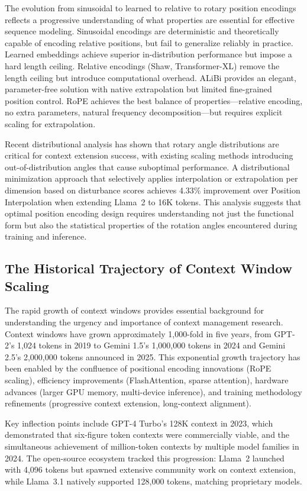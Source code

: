 \documentclass[11pt,letterpaper]{article}
\begin{document}
The evolution from sinusoidal to learned to relative to rotary position encodings reflects a progressive understanding of what properties are essential for effective sequence modeling. Sinusoidal encodings are deterministic and theoretically capable of encoding relative positions, but fail to generalize reliably in practice. Learned embeddings achieve superior in-distribution performance but impose a hard length ceiling. Relative encodings (Shaw, Transformer-XL) remove the length ceiling but introduce computational overhead. ALiBi provides an elegant, parameter-free solution with native extrapolation but limited fine-grained position control. RoPE achieves the best balance of properties---relative encoding, no extra parameters, natural frequency decomposition---but requires explicit scaling for extrapolation.

Recent distributional analysis has shown that rotary angle distributions are critical for context extension success, with existing scaling methods introducing out-of-distribution angles that cause suboptimal performance. A distributional minimization approach that selectively applies interpolation or extrapolation per dimension based on disturbance scores achieves 4.33\% improvement over Position Interpolation when extending Llama~2 to 16K tokens. This analysis suggests that optimal position encoding design requires understanding not just the functional form but also the statistical properties of the rotation angles encountered during training and inference.

\subsection{The Historical Trajectory of Context Window Scaling}

The rapid growth of context windows provides essential background for understanding the urgency and importance of context management research. Context windows have grown approximately 1,000-fold in five years, from GPT-2's 1,024 tokens in 2019 to Gemini 1.5's 1,000,000 tokens in 2024 and Gemini 2.5's 2,000,000 tokens announced in 2025. This exponential growth trajectory has been enabled by the confluence of positional encoding innovations (RoPE scaling), efficiency improvements (FlashAttention, sparse attention), hardware advances (larger GPU memory, multi-device inference), and training methodology refinements (progressive context extension, long-context alignment).

Key inflection points include GPT-4 Turbo's 128K context in 2023, which demonstrated that six-figure token contexts were commercially viable, and the simultaneous achievement of million-token contexts by multiple model families in 2024. The open-source ecosystem tracked this progression: Llama~2 launched with 4,096 tokens but spawned extensive community work on context extension, while Llama~3.1 natively supported 128,000 tokens, matching proprietary models.
\end{document}
